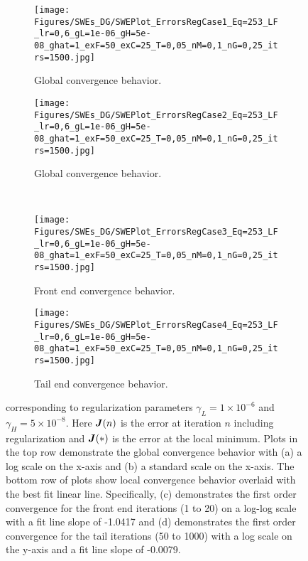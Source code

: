 \begin{center}
\begin{figure}[H]
    \begin{subfigure}[t]{0.49\textwidth}
        \centering
        \texttt{[image: Figures/SWEs\_DG/SWEPlot\_ErrorsRegCase1\_Eq=253\_LF\_lr=0,6\_gL=1e-06\_gH=5e-08\_ghat=1\_exF=50\_exC=25\_T=0,05\_nM=0,1\_nG=0,25\_itrs=1500.jpg]}
        \caption{Global convergence behavior.}
    \end{subfigure}
    \begin{subfigure}[t]{0.49\textwidth}
        \centering
        \texttt{[image: Figures/SWEs\_DG/SWEPlot\_ErrorsRegCase2\_Eq=253\_LF\_lr=0,6\_gL=1e-06\_gH=5e-08\_ghat=1\_exF=50\_exC=25\_T=0,05\_nM=0,1\_nG=0,25\_itrs=1500.jpg]}
        \caption{Global convergence behavior.}
    \end{subfigure}\\
    \begin{subfigure}[t]{0.49\textwidth}
        \texttt{[image: Figures/SWEs\_DG/SWEPlot\_ErrorsRegCase3\_Eq=253\_LF\_lr=0,6\_gL=1e-06\_gH=5e-08\_ghat=1\_exF=50\_exC=25\_T=0,05\_nM=0,1\_nG=0,25\_itrs=1500.jpg]}
        \caption{Front end convergence behavior.}
    \end{subfigure}
    \begin{subfigure}[t]{0.49\textwidth}
        \texttt{[image: Figures/SWEs\_DG/SWEPlot\_ErrorsRegCase4\_Eq=253\_LF\_lr=0,6\_gL=1e-06\_gH=5e-08\_ghat=1\_exF=50\_exC=25\_T=0,05\_nM=0,1\_nG=0,25\_itrs=1500.jpg]}
        \caption{Tail end convergence behavior.}
    \end{subfigure}
    \caption{ corresponding to regularization parameters $\gamma_L = 1 \times 10^{-6}$ and $\gamma_H = 5 \times 10^{-8}$. Here $\bm{J}(n)$ is the error at iteration $n$ including regularization and $\bm{J}(*)$ is the error at the local minimum. Plots in the top row demonstrate the global convergence behavior with (a) a log scale on the x-axis and (b) a standard scale on the x-axis. The bottom row of plots show local convergence behavior overlaid with the best fit linear line. Specifically, (c) demonstrates the first order convergence for the front end iterations (1 to 20) on a log-log scale with a fit line slope of -1.0417 and (d) demonstrates the first order convergence for the tail iterations (50 to 1000) with a log scale on the y-axis and a fit line slope of -0.0079.}
    \label{fig:err_convg_1}
\end{figure}
\end{center}

